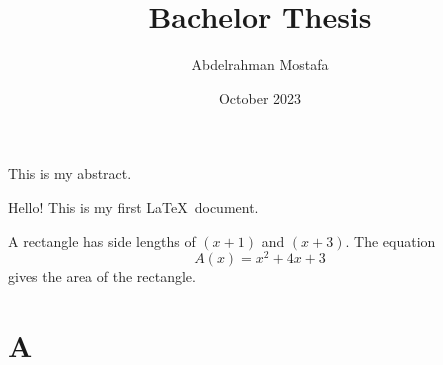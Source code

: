 \documentclass[12pt]{report}
\title{Bachelor Thesis}
\author{Abdelrahman Mostafa}
\date{October 2023}
\begin{document}
\maketitle



This is my abstract.

Hello! This is my first \LaTeX\ document.

A rectangle has side lengths of $(x+1)$ and $(x+3)$.
The equation $${A(x) = x^2 + 4x + 3}$$ gives the area 
of the rectangle.

\chapter{A}
\end{document}
